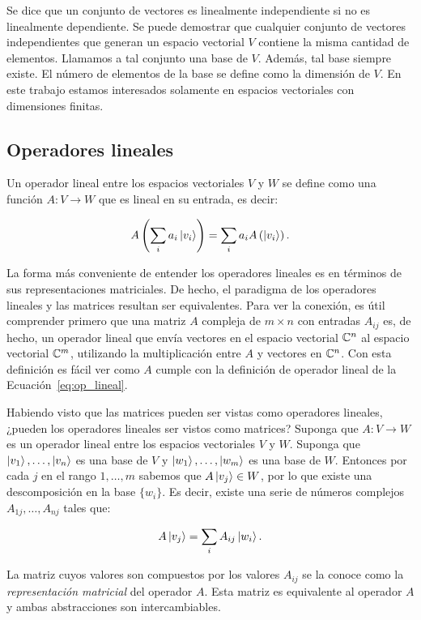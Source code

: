 Se dice que un conjunto de vectores es linealmente independiente si no es linealmente dependiente. Se puede demostrar que cualquier conjunto de vectores independientes que generan un espacio vectorial $V$ contiene la misma cantidad de elementos. Llamamos a tal conjunto una base de $V$. Además, tal base siempre existe. El número de elementos de la base se define como la dimensión de $V$. En este trabajo estamos interesados solamente en espacios vectoriales con dimensiones finitas.

\subsection{Operadores lineales}
Un operador lineal entre los espacios vectoriales $V$ y $W$ se define como una función $A: V \rightarrow W$ que es lineal en su entrada, es decir:

\begin{equation}\label{eq:op_lineal}
    A\left(\sum_i a_i\ket{v_i}\right) = \sum_i a_i A \left(\ket{v_i}\right).
\end{equation}

La forma más conveniente de entender los operadores lineales es en términos de sus representaciones matriciales. De hecho, el paradigma de los operadores lineales y las matrices resultan ser equivalentes. Para ver la conexión, es útil comprender primero que una matriz $A$ compleja de $m\times n$ con entradas $A_{ij}$ es, de hecho, un operador lineal que envía vectores en el espacio vectorial $\mathbb{C}^n$ al espacio vectorial $\mathbb{C}^m$, utilizando la multiplicación entre $A$ y vectores en $\mathbb{C}^n$. Con esta definición es fácil ver como $A$ cumple con la definición de operador lineal de la Ecuación~\ref{eq:op_lineal}.

Habiendo visto que las matrices pueden ser vistas como operadores lineales, ¿pueden los operadores lineales ser vistos como matrices? Suponga que $A: V \rightarrow W$ es un operador lineal entre los espacios vectoriales $V$ y $W$. Suponga que $\ket{v_1}, \dots, \ket{v_n}$ es una base de $V$ y $\ket{w_1}, \dots, \ket{w_m}$ es una base de $W$. Entonces por cada $j$ en el rango $1, \dots, m$ sabemos que $A\ket{v_j}\in W$, por lo que existe una descomposición en la base $\{w_i\}$. Es decir, existe una serie de números complejos $A_{1j}, \dots, A_{nj}$ tales que:

\[A\ket{v_j} = \sum_i A_{ij} \ket{w_i}.\]

La matriz cuyos valores son compuestos por los valores $A_{ij}$ se la conoce como la \emph{representación matricial} del operador $A$. Esta matriz es equivalente al operador $A$ y ambas abstracciones son intercambiables.

